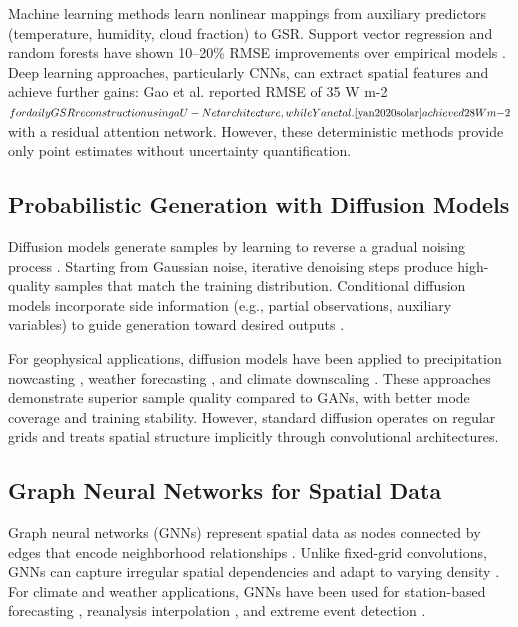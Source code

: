 \documentclass[preprint,12pt]{elsarticle}
\begin{document}
Machine learning methods learn nonlinear mappings from auxiliary predictors (temperature, humidity, cloud fraction) to GSR. Support vector regression and random forests have shown 10--20\% RMSE improvements over empirical models \cite{wu2018estimating, fan2019solar}. Deep learning approaches, particularly CNNs, can extract spatial features and achieve further gains: Gao et al. \cite{gao2020deep} reported RMSE of 35 W m{-2}$ for daily GSR reconstruction using a U-Net architecture, while Yan et al. \cite{yan2020solar} achieved 28 W m{-2}$ with a residual attention network. However, these deterministic methods provide only point estimates without uncertainty quantification.

\subsection{Probabilistic Generation with Diffusion Models}

Diffusion models generate samples by learning to reverse a gradual noising process \cite{ho2020denoising, song2020denoising}. Starting from Gaussian noise, iterative denoising steps produce high-quality samples that match the training distribution. Conditional diffusion models incorporate side information (e.g., partial observations, auxiliary variables) to guide generation toward desired outputs \cite{dhariwal2021diffusion}.

For geophysical applications, diffusion models have been applied to precipitation nowcasting \cite{gao2022diffusion}, weather forecasting \cite{price2024gencast}, and climate downscaling \cite{mardani2023generative}. These approaches demonstrate superior sample quality compared to GANs, with better mode coverage and training stability. However, standard diffusion operates on regular grids and treats spatial structure implicitly through convolutional architectures.

\subsection{Graph Neural Networks for Spatial Data}

Graph neural networks (GNNs) represent spatial data as nodes connected by edges that encode neighborhood relationships \cite{kipf2017semi, velickovic2018graph}. Unlike fixed-grid convolutions, GNNs can capture irregular spatial dependencies and adapt to varying density \cite{bronstein2017geometric}. For climate and weather applications, GNNs have been used for station-based forecasting \cite{lam2023graph}, reanalysis interpolation \cite{chen2023graph}, and extreme event detection \cite{liu2023graph}.
\end{document}
